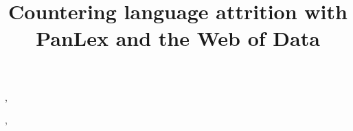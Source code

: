 \documentclass[sw]{iosart2c}
\newcommand*{\origtodo}{}
\let\origtodo\todo
\renewcommand*{\todo}{\origtodo[inline]}
\begin{document}
\begin{frontmatter} 



\title{Countering language attrition with PanLex and the Web of Data}


\author[1]{ },
\author[2]{ },
\author[3]{ }
\address[1]{University of Leipzig, patrick.westphal@studserv.uni-leipzig.de}
\address[2]{University of Leipzig, cstadler@informatik.uni-leipzig.de}
\address[3]{Long Now Foundation, San Francisco, pool@utilika.org}










\end{frontmatter}
\end{document}
